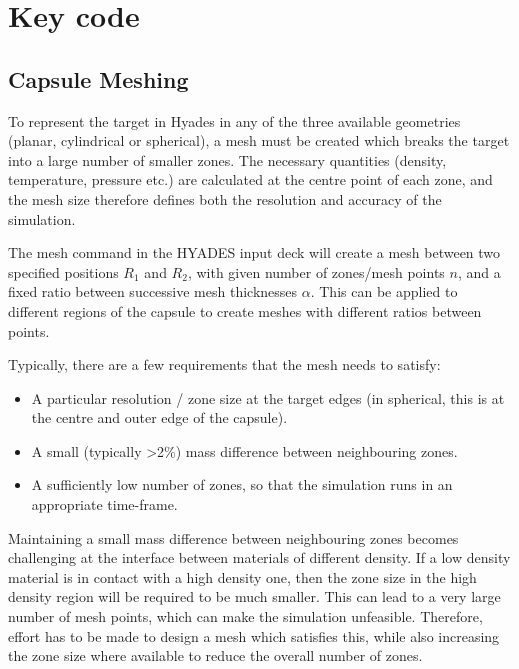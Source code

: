 

\chapter{Key code} \label{app:KeyCode}

\minitoc


\section{Capsule Meshing}
To represent the target in Hyades in any of the three available geometries (planar, cylindrical or spherical), a mesh must be created which breaks the target into a large number of smaller zones. The necessary quantities (density, temperature, pressure etc.) are calculated at the centre point of each zone, and the mesh size therefore defines both the resolution and accuracy of the simulation. 

The mesh command in the HYADES input deck will create a mesh between two specified positions $R_1$ and $R_2$, with given number of zones/mesh points $n$, and a fixed ratio between successive mesh thicknesses $\alpha$. This can be applied to different regions of the capsule to create meshes with different ratios between points.

Typically, there are a few requirements that the mesh needs to satisfy:
\begin{itemize}
    \item A particular resolution / zone size at the target edges (in spherical, this is at the centre and outer edge of the capsule).
    \item A small (typically >2\%) mass difference between neighbouring zones.
    \item A sufficiently low number of zones, so that the simulation runs in an appropriate time-frame.
\end{itemize}

Maintaining a small mass difference between neighbouring zones becomes challenging at the interface between materials of different density. If a low density material is in contact with a high density one, then the zone size in the high density region will be required to be much smaller. This can lead to a very large number of mesh points, which can make the simulation unfeasible. Therefore, effort has to be made to design a mesh which satisfies this, while also increasing the zone size where available to reduce the overall number of zones.

